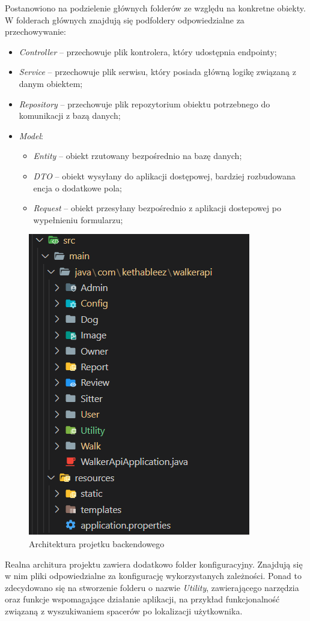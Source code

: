 Postanowiono na podzielenie głównych folderów ze względu na konkretne obiekty.
W folderach głównych znajdują się podfoldery odpowiedzialne za przechowywanie: 
\begin{itemize}[leftmargin=1cm]
  \item \textit{Controller} -- przechowuje plik kontrolera, który udostępnia endpointy;
  \item \textit{Service} -- przechowuje plik serwisu, który posiada główną logikę związaną z danym obiektem;
  \item \textit{Repository} -- przechowuje plik repozytorium obiektu potrzebnego do komunikacji z bazą danych;
  \item \textit{Model}:
  \begin{itemize}
    \item \textit{Entity} -- obiekt rzutowany bezpośrednio na bazę danych;
    \item \textit{DTO} -- obiekt wysyłany do aplikacji dostępowej, bardziej rozbudowana encja o dodatkowe pola;
    \item \textit{Request} -- obiekt przesyłany bezpośrednio z aplikacji dostepowej po wypełnieniu formularzu;
  \end{itemize}
\end{itemize}

\begin{figure}[H]
  \centering
  \includegraphics[width=0.5\linewidth]{rysunki/arch-java.PNG}
  \caption{Architektura projetku backendowego}
  \label{fig:java-architecture}
\end{figure}
Realna architura projektu zawiera dodatkowo folder konfiguracyjny. Znajdują się w nim pliki odpowiedzialne za konfigurację wykorzystanych zależności. Ponad to zdecydowano się na stworzenie folderu o nazwie \textit{Utility}, zawierającego narzędzia oraz funkcje wspomagające działanie aplikacji, na przykład funkcjonalność związaną z wyszukiwaniem spacerów po lokalizacji użytkownika.

